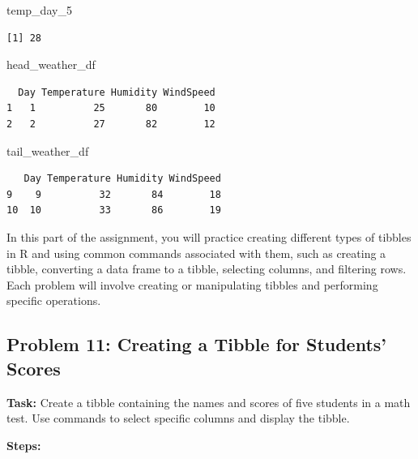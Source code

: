 \documentclass[
  letterpaper,
  DIV=11,
  numbers=noendperiod]{scrreprt}
\newenvironment{Shaded}{\begin{snugshade}}{\end{snugshade}}
\newcommand{\NormalTok}[1]{\textcolor[rgb]{0.00,0.23,0.31}{#1}}
\begin{document}
\begin{Shaded}
\begin{Highlighting}[]
\NormalTok{temp\_day\_5}
\end{Highlighting}
\end{Shaded}

\begin{verbatim}
[1] 28
\end{verbatim}

\begin{Shaded}
\begin{Highlighting}[]
\NormalTok{head\_weather\_df}
\end{Highlighting}
\end{Shaded}

\begin{verbatim}
  Day Temperature Humidity WindSpeed
1   1          25       80        10
2   2          27       82        12
\end{verbatim}

\begin{Shaded}
\begin{Highlighting}[]
\NormalTok{tail\_weather\_df}
\end{Highlighting}
\end{Shaded}

\begin{verbatim}
   Day Temperature Humidity WindSpeed
9    9          32       84        18
10  10          33       86        19
\end{verbatim}

In this part of the assignment, you will practice creating different
types of tibbles in R and using common commands associated with them,
such as creating a tibble, converting a data frame to a tibble,
selecting columns, and filtering rows. Each problem will involve
creating or manipulating tibbles and performing specific operations.

\subsection*{Problem 11: Creating a Tibble for Students'
Scores}\label{problem-11-creating-a-tibble-for-students-scores}

\textbf{Task:} Create a tibble containing the names and scores of five
students in a math test. Use commands to select specific columns and
display the tibble.

\textbf{Steps:}
\end{document}

